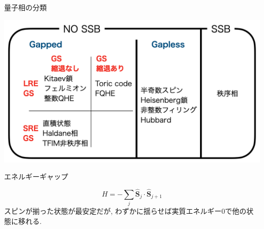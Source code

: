 \documentclass[dvipdfm]{beamer}
\begin{document}
\begin{frame}{量子相の分類}
    \begin{center}
        \includegraphics[width=\linewidth]{phase-diag.png}
    \end{center}
\end{frame}

\begin{frame}{エネルギーギャップ}
    \begin{example}
        \begin{equation*}
            H=-\sum_j\hat{\bm{S}}_j\cdot\hat{\bm{S}}_{j+1}
        \end{equation*}
        スピンが揃った状態が最安定だが, わずかに揺らせば実質エネルギー0で他の状態に移れる.
        \begin{figure}
            \centering
        \end{figure}
    \end{example}
    \alert{}
\end{frame}
\end{document}
